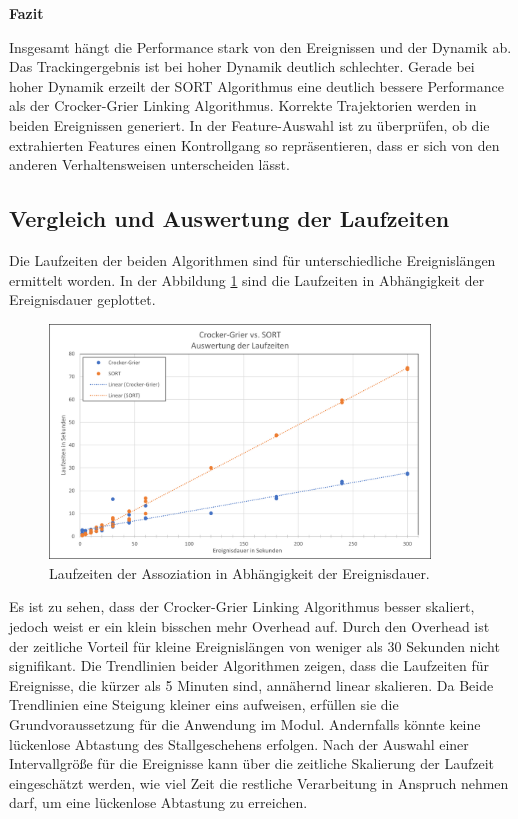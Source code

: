 \textbf{Fazit}\par
Insgesamt hängt die Performance stark von den Ereignissen und der Dynamik ab. Das Trackingergebnis ist bei hoher Dynamik deutlich schlechter. Gerade bei hoher Dynamik erzeilt der SORT Algorithmus eine deutlich bessere Performance als der Crocker-Grier Linking Algorithmus. Korrekte Trajektorien werden in beiden Ereignissen generiert. In der Feature-Auswahl ist zu überprüfen, ob die extrahierten Features einen Kontrollgang so repräsentieren, dass er sich von den anderen Verhaltensweisen unterscheiden lässt.


\subsection{Vergleich und Auswertung der Laufzeiten}
Die Laufzeiten der beiden Algorithmen sind für unterschiedliche Ereignislängen ermittelt worden. In der Abbildung \ref{fig:plotRunTMOT} sind die Laufzeiten in Abhängigkeit der Ereignisdauer geplottet.

\begin{figure}[htb]
    \centering
    \includegraphics[width=0.9\textwidth]{img/Plots/MOT Evaluation/Assoziationsalgorithmen Laufzeiten.png}  
    \caption{Laufzeiten der Assoziation in Abhängigkeit der Ereignisdauer.}
    \label{fig:plotRunTMOT}
\end{figure}

Es ist zu sehen, dass der Crocker-Grier Linking Algorithmus besser skaliert, jedoch weist er ein klein bisschen mehr Overhead auf. Durch den Overhead ist der zeitliche Vorteil für kleine Ereignislängen von weniger als 30 Sekunden nicht signifikant. Die Trendlinien beider Algorithmen zeigen, dass die Laufzeiten für Ereignisse, die kürzer als 5 Minuten sind, annähernd linear skalieren. Da Beide Trendlinien eine Steigung kleiner eins aufweisen, erfüllen sie die Grundvoraussetzung für die Anwendung im Modul. Andernfalls könnte keine lückenlose Abtastung des Stallgeschehens erfolgen. Nach der Auswahl einer Intervallgröße für die Ereignisse kann über die zeitliche Skalierung der Laufzeit eingeschätzt werden, wie viel Zeit die restliche Verarbeitung in Anspruch nehmen darf, um eine lückenlose Abtastung zu erreichen.  \dubpar

